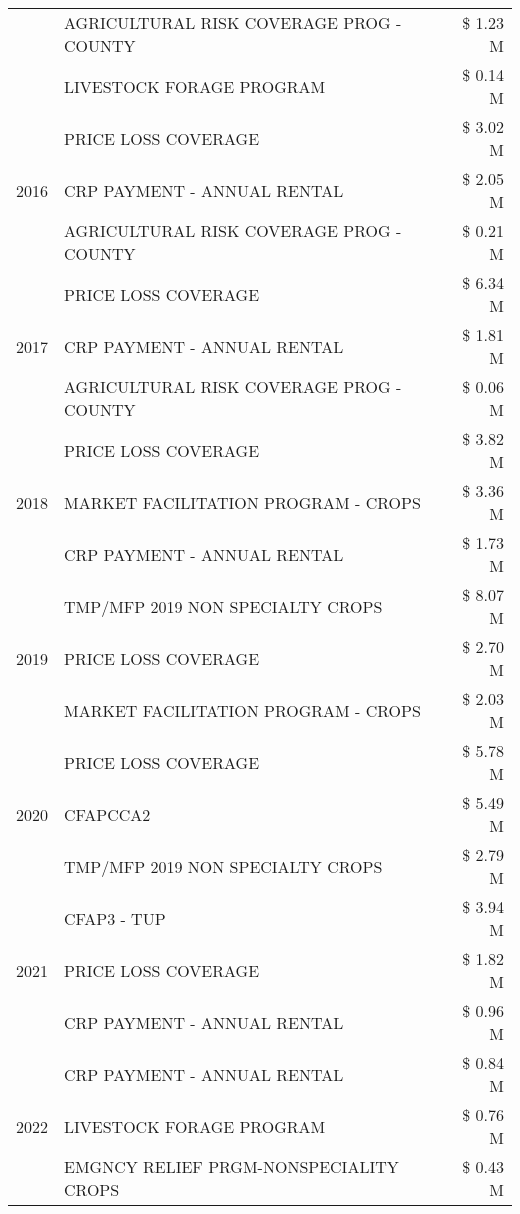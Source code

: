 \begin{tabular}{llr}
 & AGRICULTURAL RISK COVERAGE PROG - COUNTY & \$ 1.23 M \\
 & LIVESTOCK FORAGE PROGRAM & \$ 0.14 M \\
\cline{1-3}
\multirow[t]{3}{*}{2016} & PRICE LOSS COVERAGE & \$ 3.02 M \\
 & CRP PAYMENT - ANNUAL RENTAL & \$ 2.05 M \\
 & AGRICULTURAL RISK COVERAGE PROG - COUNTY & \$ 0.21 M \\
\cline{1-3}
\multirow[t]{3}{*}{2017} & PRICE LOSS COVERAGE & \$ 6.34 M \\
 & CRP PAYMENT - ANNUAL RENTAL & \$ 1.81 M \\
 & AGRICULTURAL RISK COVERAGE PROG - COUNTY & \$ 0.06 M \\
\cline{1-3}
\multirow[t]{3}{*}{2018} & PRICE LOSS COVERAGE & \$ 3.82 M \\
 & MARKET FACILITATION PROGRAM - CROPS & \$ 3.36 M \\
 & CRP PAYMENT - ANNUAL RENTAL & \$ 1.73 M \\
\cline{1-3}
\multirow[t]{3}{*}{2019} & TMP/MFP 2019 NON SPECIALTY CROPS & \$ 8.07 M \\
 & PRICE LOSS COVERAGE & \$ 2.70 M \\
 & MARKET FACILITATION PROGRAM - CROPS & \$ 2.03 M \\
\cline{1-3}
\multirow[t]{3}{*}{2020} & PRICE LOSS COVERAGE & \$ 5.78 M \\
 & CFAPCCA2 & \$ 5.49 M \\
 & TMP/MFP 2019 NON SPECIALTY CROPS & \$ 2.79 M \\
\cline{1-3}
\multirow[t]{3}{*}{2021} & CFAP3 - TUP & \$ 3.94 M \\
 & PRICE LOSS COVERAGE & \$ 1.82 M \\
 & CRP PAYMENT - ANNUAL RENTAL & \$ 0.96 M \\
\cline{1-3}
\multirow[t]{3}{*}{2022} & CRP PAYMENT - ANNUAL RENTAL & \$ 0.84 M \\
 & LIVESTOCK FORAGE PROGRAM & \$ 0.76 M \\
 & EMGNCY RELIEF PRGM-NONSPECIALITY CROPS & \$ 0.43 M \\
\cline{1-3}
\bottomrule
\end{tabular}
